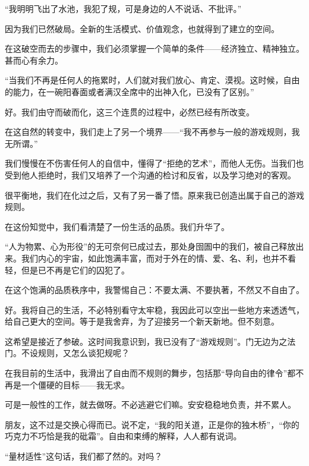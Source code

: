 \par “我明明飞出了水池，我犯了规，可是身边的人不说话、不批评。”
\par 因为我们已然破局。全新的生活模式、价值观念，也就得到了建立的空间。
\par 在这破空而去的步骤中，我们必须掌握一个简单的条件——经济独立、精神独立。甚而心有余力。
\par “当我们不再是任何人的拖累时，人们就对我们放心、肯定、漠视。这时候，自由的能力，在一碗阳春面或者满汉全席中的出神入化，已没有了区别。”
\par 好。我们由守而破而化，这三个连贯的过程中，必然已经有所改变。
\par 在这自然的转变中，我们走上了另一个境界——“我不再参与一般的游戏规则，我无所谓。”
\par 我们慢慢在不伤害任何人的自信中，懂得了“拒绝的艺术”，而他人无伤。当我们也受到他人拒绝时，我们又培养了一个沟通的检讨和反省，以及学习绝对的客观。
\par 很平衡地，我们在化过之后，又有了另一番了悟。原来我已创造出属于自己的游戏规则。
\par 在这份知觉中，我们看清楚了一份生活的品质。我们升华了。
\par “人为物累、心为形役”的无可奈何已成过去，那处身囹圄中的我们，被自己释放出来。我们内心的宇宙，如此饱满丰富，而对于外在的情、爱、名、利，也并不看轻，但是已不再是它们的囚犯了。
\par 在这个饱满的品质秩序中，我警惕自己：不要太满、不要执著，不然又不自由了。
\par 好。我将自己的生活，不必特别看守太牢稳，我因此可以空出一些地方来透透气，给自己更大的空间。等于是我舍弃，为了迎接另一个新天新地。但不刻意。
\par 这希望是接近了参破。这时间我意识到，我已没有了“游戏规则”。门无边为之法门。不设规则，又怎么谈犯规呢？
\par 在我目前的生活中，我滑出了自由而不规则的舞步，包括那“导向自由的律令”都不再是一个僵硬的目标——我无求。
\par 可是一般性的工作，就去做呀。不必逃避它们嘛。安安稳稳地负责，并不累人。
\par 朋友，这不过是交换心得而已。说不定，“我的阳关道，正是你的独木桥”，“你的巧克力不巧恰是我的砒霜”。自由和束缚的解释，人人都有说词。
\par “量材适性”这句话，我们都了然的。对吗？
\par {}

